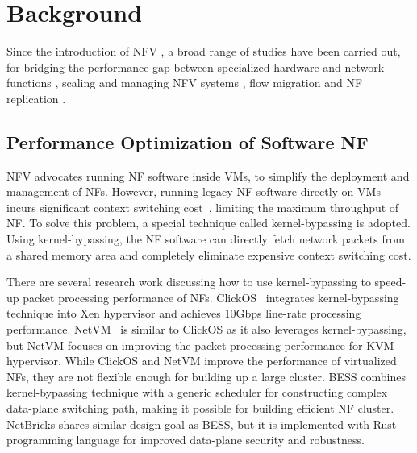 \chapter {Background}
\label{ch:background}

Since the introduction of NFV \cite{nfv-white-paper}, a broad range of studies have been carried out, for bridging the performance gap between specialized hardware and network functions \cite{hwang2015netvm, bess, martins2014clickos, 199352}, scaling and managing NFV systems \cite{gember2012stratos, palkar2015e2}, flow migration \cite{rajagopalan2013split, khalid2016paving, gember2015opennf, qazi2017high} and NF replication \cite{rajagopalan2013pico, sherry2015rollback}.

\section{Performance Optimization of Software NF}

NFV advocates running NF software inside VMs, to simplify the deployment and management of NFs. However, running legacy NF software directly on VMs incurs significant context switching cost~\cite{rizzo2013speeding}, limiting the maximum throughput of NF. To solve this problem, a special technique called kernel-bypassing \cite{180843} is adopted. Using kernel-bypassing, the NF software can directly fetch network packets from a shared memory area and completely eliminate expensive context switching cost.

There are several research work discussing how to use kernel-bypassing to speed-up packet processing performance of NFs. ClickOS~\cite{martins2014clickos} integrates kernel-bypassing technique into Xen \cite{xen} hypervisor and achieves 10Gbps line-rate processing performance. NetVM~\cite{hwang2015netvm} is similar to ClickOS as it also leverages kernel-bypassing, but NetVM focuses on improving the packet processing performance for KVM \cite{kvm} hypervisor. While ClickOS and NetVM improve the performance of virtualized NFs, they are not flexible enough for building up a large cluster. BESS \cite{bess} combines kernel-bypassing technique with a generic scheduler for constructing complex data-plane switching path, making it possible for building efficient NF cluster. NetBricks \cite{199352} shares similar design goal as BESS, but it is implemented with Rust \cite{rust} programming language for improved data-plane security and robustness.


